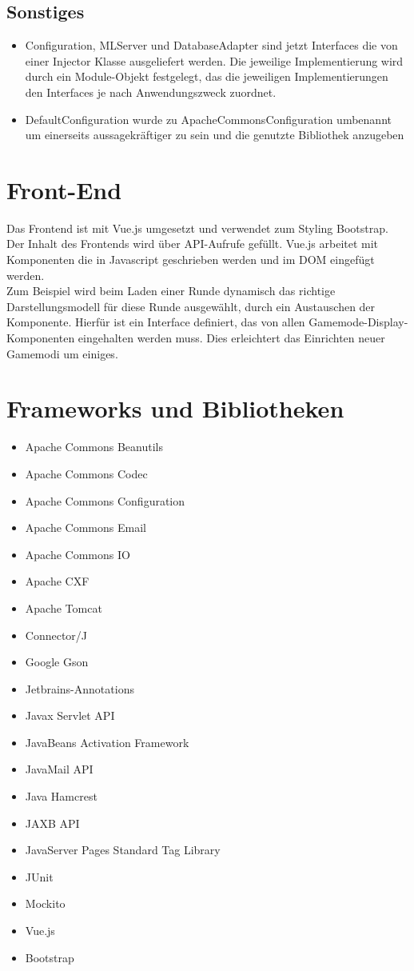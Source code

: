\documentclass[a4paper]{scrreprt}
\begin{document}
\section{Sonstiges}
\begin{itemize}
    \item Configuration, MLServer und DatabaseAdapter sind jetzt Interfaces die von einer Injector Klasse ausgeliefert werden.
    Die jeweilige Implementierung wird durch ein Module-Objekt festgelegt, das die jeweiligen Implementierungen den Interfaces je nach Anwendungszweck zuordnet.
    \item DefaultConfiguration wurde zu ApacheCommonsConfiguration umbenannt um einerseits aussagekräftiger zu sein und die genutzte Bibliothek anzugeben
\end{itemize}

\chapter{Front-End}
Das Frontend ist mit Vue.js umgesetzt und verwendet zum Styling Bootstrap. Der Inhalt des Frontends wird über API-Aufrufe gefüllt.
Vue.js arbeitet mit Komponenten die in Javascript geschrieben werden und im DOM eingefügt werden. \\
Zum Beispiel wird beim Laden einer Runde dynamisch das richtige Darstellungsmodell für diese Runde ausgewählt, durch ein Austauschen der Komponente. Hierfür ist ein Interface definiert, das von allen Gamemode-Display-Komponenten eingehalten werden muss. Dies erleichtert das Einrichten neuer Gamemodi um einiges.
\chapter{Frameworks und Bibliotheken}
\begin{itemize}
    \item Apache Commons Beanutils
    \item Apache Commons Codec
    \item Apache Commons Configuration
    \item Apache Commons Email
    \item Apache Commons IO
    \item Apache CXF
    \item Apache Tomcat
    \item Connector/J
    \item Google Gson
    \item Jetbrains-Annotations
    \item Javax Servlet API
    \item JavaBeans Activation Framework
    \item JavaMail API
    \item Java Hamcrest
    \item JAXB API
    \item JavaServer Pages Standard Tag Library
    \item JUnit
    \item Mockito
    \item Vue.js
    \item Bootstrap
\end{itemize}
\end{document}
